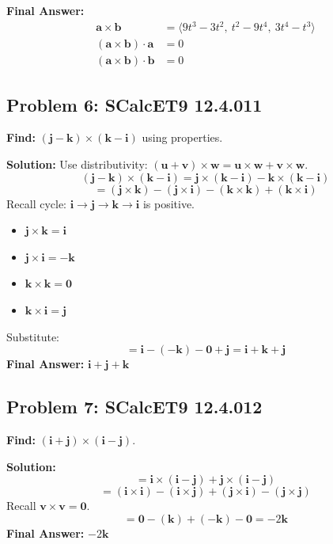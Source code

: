 \documentclass[11pt]{article}
\renewcommand{\vec}[1]{\mathbf{#1}}
\newcommand{\ihat}{\mathbf{i}}
\newcommand{\jhat}{\mathbf{j}}
\newcommand{\khat}{\mathbf{k}}
\begin{document}
\textbf{Final Answer:}
\begin{align*}
\vec{a} \times \vec{b} &= \langle 9t^3 - 3t^2, \ t^2 - 9t^4, \ 3t^4 - t^3 \rangle \\
(\vec{a} \times \vec{b}) \cdot \vec{a} &= 0 \\
(\vec{a} \times \vec{b}) \cdot \vec{b} &= 0
\end{align*}

\hrulefill

\subsection*{Problem 6: SCalcET9 12.4.011}
\textbf{Find:} $(\jhat - \khat) \times (\khat - \ihat)$ using properties.

\textbf{Solution:}
Use distributivity: $(\vec{u} + \vec{v}) \times \vec{w} = \vec{u} \times \vec{w} + \vec{v} \times \vec{w}$.
\[
(\jhat - \khat) \times (\khat - \ihat) = \jhat \times (\khat - \ihat) - \khat \times (\khat - \ihat)
\]
\[
= (\jhat \times \khat) - (\jhat \times \ihat) - (\khat \times \khat) + (\khat \times \ihat)
\]
Recall cycle: $\ihat \to \jhat \to \khat \to \ihat$ is positive.
\begin{itemize}
    \item $\jhat \times \khat = \ihat$
    \item $\jhat \times \ihat = -\khat$
    \item $\khat \times \khat = \vec{0}$
    \item $\khat \times \ihat = \jhat$
\end{itemize}
Substitute:
\[
= \ihat - (-\khat) - \vec{0} + \jhat = \ihat + \khat + \jhat
\]
\textbf{Final Answer:} $\ihat + \jhat + \khat$

\hrulefill

\subsection*{Problem 7: SCalcET9 12.4.012}
\textbf{Find:} $(\ihat + \jhat) \times (\ihat - \jhat)$.

\textbf{Solution:}
\[
= \ihat \times (\ihat - \jhat) + \jhat \times (\ihat - \jhat)
\]
\[
= (\ihat \times \ihat) - (\ihat \times \jhat) + (\jhat \times \ihat) - (\jhat \times \jhat)
\]
Recall $\vec{v} \times \vec{v} = \vec{0}$.
\[
= \vec{0} - (\khat) + (-\khat) - \vec{0} = -2\khat
\]
\textbf{Final Answer:} $-2\khat$

\hrulefill
\end{document}
